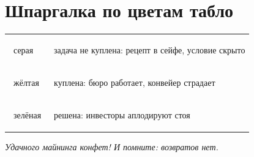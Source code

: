 \documentclass[12pt,a4paper]{article}
\begin{document}
\section*{Шпаргалка по цветам табло}

\begin{center}
\begin{tabular}{ll}
\toprule
\colorbox{gray!30}{\strut ~серая~}   & задача не куплена: рецепт в сейфе, условие скрыто \\
\colorbox{yellow!60}{\strut ~жёлтая~} & куплена: бюро работает, конвейер страдает \\
\colorbox{green!40}{\strut ~зелёная~} & решена: инвесторы аплодируют стоя \\
\bottomrule
\end{tabular}
\end{center}

\vspace{1em}
\begin{center}
\emph{Удачного майнинга конфет! И помните: возвратов нет.}
\end{center}
\end{document}
